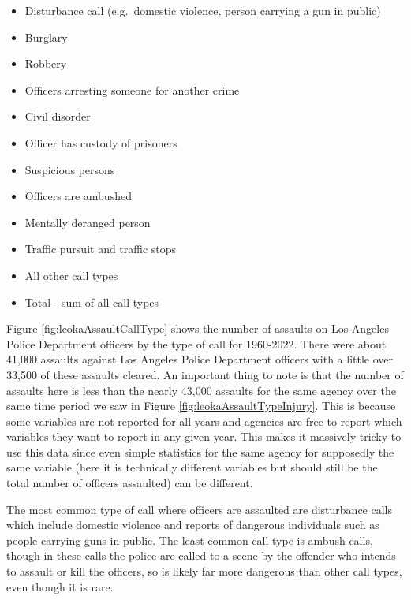 \documentclass[
]{krantz}
\providecommand{\tightlist}{%
  \setlength{\itemsep}{0pt}\setlength{\parskip}{0pt}}
\begin{document}
\begin{itemize}
\tightlist
\item
  Disturbance call (e.g.~domestic violence, person carrying
  a gun in public)
\item
  Burglary
\item
  Robbery
\item
  Officers arresting someone for another crime
\item
  Civil disorder
\item
  Officer has custody of prisoners
\item
  Suspicious persons
\item
  Officers are ambushed
\item
  Mentally deranged person
\item
  Traffic pursuit and traffic stops
\item
  All other call types
\item
  Total - sum of all call types
\end{itemize}

Figure \ref{fig:leokaAssaultCallType} shows the number of
assaults on Los Angeles Police Department officers by the
type of call for 1960-2022. There were about 41,000 assaults
against Los Angeles Police Department officers with a little
over 33,500 of these assaults cleared. An important thing to
note is that the number of assaults here is less than the
nearly 43,000 assaults for the same agency over the same
time period we saw in Figure
\ref{fig:leokaAssaultTypeInjury}. This is because some
variables are not reported for all years and agencies are
free to report which variables they want to report in any
given year. This makes it massively tricky to use this data
since even simple statistics for the same agency for
supposedly the same variable (here it is technically
different variables but should still be the total number of
officers assaulted) can be different.

The most common type of call where officers are assaulted
are disturbance calls which include domestic violence and
reports of dangerous individuals such as people carrying
guns in public. The least common call type is ambush calls,
though in these calls the police are called to a scene by
the offender who intends to assault or kill the officers, so
is likely far more dangerous than other call types, even
though it is rare.
\end{document}
